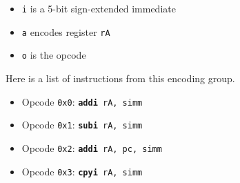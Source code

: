 \documentclass{article}
\begin{document}
	\singlespacing
	\begin{itemize}
		\item \texttt{i} is a 5-bit sign-extended immediate
		\item \texttt{a} encodes register \texttt{rA}
		\item \texttt{o} is the opcode
	\end{itemize}
	\doublespacing

	Here is a list of instructions from this encoding group.

	\singlespacing
	\begin{itemize}
		\item Opcode \texttt{0x0}:
			\texttt{\textbf{addi} rA, simm}
		\item Opcode \texttt{0x1}:
			\texttt{\textbf{subi} rA, simm}
		\item Opcode \texttt{0x2}:
			\texttt{\textbf{addi} rA, pc, simm}
		\item Opcode \texttt{0x3}:
			\texttt{\textbf{cpyi} rA, simm}
		\begin{itemize}

\end{itemize}
\end{itemize}
\end{document}
